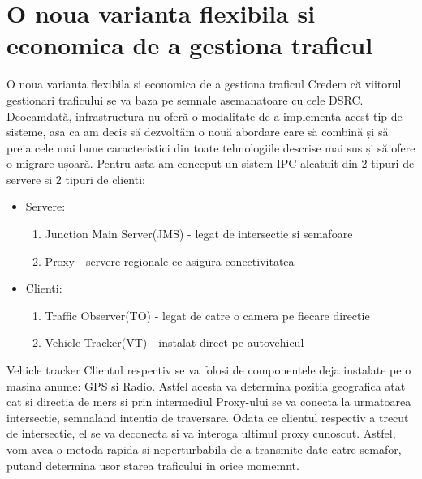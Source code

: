 \documentclass{beamer}
\begin{document}
\section{O noua varianta flexibila si economica de a gestiona traficul}
    \begin{frame}{O noua varianta flexibila si economica de a gestiona traficul}
        Credem că viitorul gestionari traficului se va baza pe semnale
        asemanatoare cu cele DSRC. Deocamdată, infrastructura nu oferă o
        modalitate de a implementa acest tip de sisteme, asa ca am decis
        să dezvoltăm o nouă abordare care să combină și să preia cele mai
        bune caracteristici din toate tehnologiile descrise mai sus și să
        ofere o migrare ușoară. Pentru asta am conceput un sistem IPC 
        alcatuit din 2 tipuri de servere si 2 tipuri de clienti:
        \begin{itemize}[<+-| alert@+>]
            \item Servere: 
            \begin{enumerate}
                \item  Junction Main Server(JMS) - legat de intersectie si semafoare
                \item  Proxy - servere regionale ce asigura conectivitatea
            \end{enumerate}
            \item Clienti:
            \begin{enumerate}
                \item Traffic Observer(TO) - legat de catre o camera pe fiecare directie
                \item Vehicle Tracker(VT) - instalat direct pe autovehicul
            \end{enumerate}
        \end{itemize}

    \end{frame}

    \begin{frame}{Vehicle tracker}
        Clientul respectiv se va folosi de componentele deja instalate 
        pe o masina anume: GPS si Radio. Astfel acesta va determina 
        pozitia geografica atat cat si directia de mers si prin
        intermediul Proxy-ului se va conecta la urmatoarea intersectie, 
        semnaland intentia de traversare. Odata ce clientul respectiv 
        a trecut de intersectie, el se va deconecta si va interoga 
        ultimul proxy cunoscut. Astfel, vom avea o metoda rapida si 
        neperturbabila de a transmite date catre semafor, putand determina 
        usor starea traficului in orice momemnt.
    \end{frame}
\end{document}
